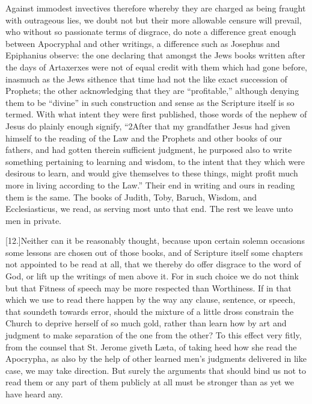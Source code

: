 Against immodest invectives therefore whereby they are charged as being fraught with outrageous lies, we doubt not but their more allowable censure will prevail, who without so passionate terms of disgrace, do note a difference great enough between Apocryphal and other writings, a difference such as Josephus and Epiphanius observe: the one declaring that amongst the Jews books written after the days of Artaxerxes were not of equal credit with them which had gone before, inasmuch as the Jews sithence that time had not the like exact succession of Prophets; the other acknowledging that  they are “profitable,” although denying them to be “divine” in such construction and sense as the Scripture itself is so termed.
 With what intent they were first published, those words of the nephew of Jesus do plainly enough signify, “2After that my grandfather Jesus had given himself to the reading of the Law and the Prophets and other books of our fathers, and had gotten therein sufficient judgment, he purposed also to write something pertaining to learning and wisdom, to the intent that they which were desirous to learn, and would give themselves to these things, might profit much more in living according to the Law.” Their end in writing and ours in reading them is the same. The books of Judith, Toby, Baruch, Wisdom, and Ecclesiasticus, we read, as serving most unto that end. The rest we leave unto men in private.

[12.]Neither can it be reasonably thought, because upon certain solemn occasions some lessons are chosen out of those books, and of Scripture itself some chapters not appointed to be read at all, that we thereby do offer disgrace to the word of God, or lift up the writings of men above it. For in such choice we do not think but that Fitness of speech may be more respected than Worthiness. If in that which we use to read there happen by the way any clause, sentence, or speech, that soundeth towards error, should the mixture of a little dross constrain the Church to deprive herself of so much gold, rather than learn how by art and judgment to make separation of the one from the other? To this effect very fitly, from the counsel that St. Jerome giveth Læta, of taking heed how she read the Apocrypha, as also by the help of other learned men’s judgments delivered in like case, we may take direction. But surely the arguments that should bind us not to read them or any part of them publicly at all must be stronger than as yet we have heard any.




